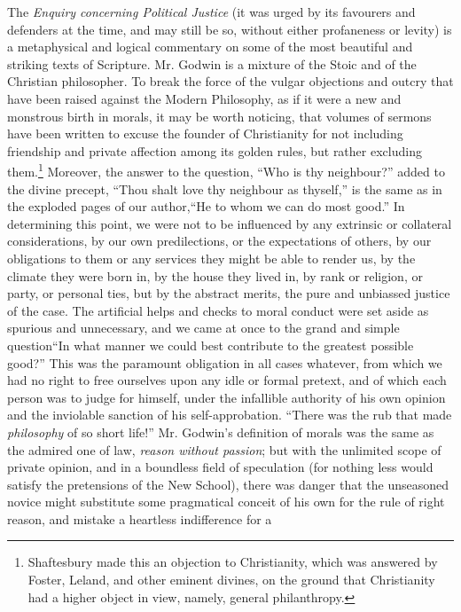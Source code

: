 The \emph{Enquiry concerning Political Justice} (it was urged by
its favourers and defenders at the time, and may still be so,
without either profaneness or levity) is a metaphysical and
logical commentary on some of the most beautiful and striking
texts of Scripture. Mr. Godwin is a mixture of the Stoic and of
the Christian philosopher. To break the force of the vulgar
objections and outcry that have been raised against the Modern
Philosophy, as if it were a new and monstrous birth in morals, it
may be worth noticing, that volumes of sermons have been written
to excuse the founder of Christianity for not including friendship
and private affection among its golden rules, but rather excluding
them.\footnote{Shaftesbury made this an objection to Christianity,
which was answered by Foster, Leland, and other eminent divines,
on the ground that Christianity had a higher object in view,
namely, general philanthropy.} Moreover, the answer to the
question, ``Who is thy neighbour?'' added to the divine precept,
``Thou shalt love thy neighbour as thyself,'' is the same as in
the exploded pages of our author,\textemdash ``He to whom we can
do most good.'' In determining this point, we were not to be
influenced by any extrinsic or collateral considerations, by our
own predilections, or the expectations of others, by our
obligations to them or any services they might be able to render
us, by the climate they were born in, by the house they lived in,
by rank or religion, or party, or personal ties, but by the
abstract merits, the pure and unbiassed justice of the case. The
artificial helps and checks to moral conduct were set aside as
spurious and unnecessary, and we came at once to the grand and
simple question\textemdash ``In what manner we could best
contribute to the greatest possible good?'' This was the paramount
obligation in all cases whatever, from which we had no right to
free ourselves upon any idle or formal pretext, and of which each
person was to judge for himself, under the infallible authority of
his own opinion and the inviolable sanction of his
self-approbation. ``There was the rub that made \emph{philosophy}
of so short life!'' Mr. Godwin's definition of morals was the same
as the admired one of law, \emph{reason without passion}; but with
the unlimited scope of private opinion, and in a boundless field
of speculation (for nothing less would satisfy the pretensions of
the New School), there was danger that the unseasoned novice might
substitute some pragmatical conceit of his own for the rule of
right reason, and mistake a heartless indifference for a
